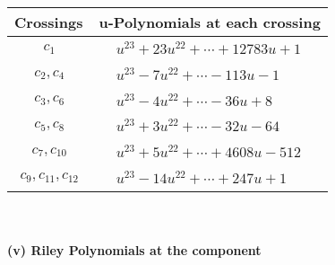 \documentclass[1p]{elsarticle_modified}
\theoremstyle{definition}
\begin{document}
\begin{tabular}{m{50pt}|m{274pt}}
Crossings & \hspace{64pt}u-Polynomials at each crossing \\
\hline $$\begin{aligned}c_{1}\end{aligned}$$&$\begin{aligned}
&u^{23}+23 u^{22}+\cdots+12783 u+1
\end{aligned}$\\
\hline $$\begin{aligned}c_{2},c_{4}\end{aligned}$$&$\begin{aligned}
&u^{23}-7 u^{22}+\cdots-113 u-1
\end{aligned}$\\
\hline $$\begin{aligned}c_{3},c_{6}\end{aligned}$$&$\begin{aligned}
&u^{23}-4 u^{22}+\cdots-36 u+8
\end{aligned}$\\
\hline $$\begin{aligned}c_{5},c_{8}\end{aligned}$$&$\begin{aligned}
&u^{23}+3 u^{22}+\cdots-32 u-64
\end{aligned}$\\
\hline $$\begin{aligned}c_{7},c_{10}\end{aligned}$$&$\begin{aligned}
&u^{23}+5 u^{22}+\cdots+4608 u-512
\end{aligned}$\\
\hline $$\begin{aligned}c_{9},c_{11},c_{12}\end{aligned}$$&$\begin{aligned}
&u^{23}-14 u^{22}+\cdots+247 u+1
\end{aligned}$\\
\hline
\end{tabular}\\~\\
\newpage\renewcommand{\arraystretch}{1}
\flushleft \textbf{(v) Riley Polynomials at the component}\newline \\
\end{document}

